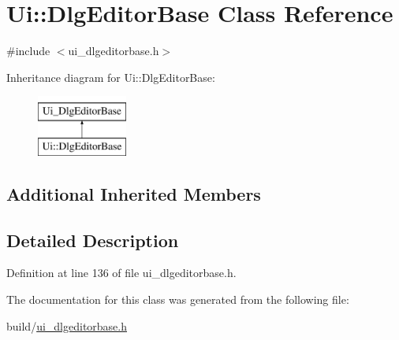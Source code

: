 \hypertarget{classUi_1_1DlgEditorBase}{\section{Ui\+:\+:Dlg\+Editor\+Base Class Reference}
\label{classUi_1_1DlgEditorBase}
}


{\ttfamily \#include $<$ui\+\_\+dlgeditorbase.\+h$>$}

Inheritance diagram for Ui\+:\+:Dlg\+Editor\+Base\+:\begin{figure}[H]
\begin{center}
\leavevmode
\includegraphics[height=2.000000cm]{classUi_1_1DlgEditorBase}
\end{center}
\end{figure}
\subsection*{Additional Inherited Members}


\subsection{Detailed Description}


Definition at line 136 of file ui\+\_\+dlgeditorbase.\+h.



The documentation for this class was generated from the following file\+:\begin{DoxyCompactItemize}
\item 
build/\hyperlink{ui__dlgeditorbase_8h}{ui\+\_\+dlgeditorbase.\+h}\end{DoxyCompactItemize}
